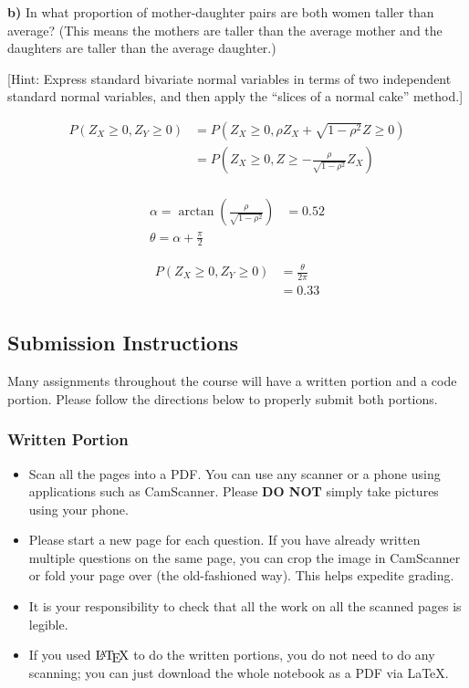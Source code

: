 \documentclass[11pt]{article}
\providecommand{\tightlist}{%
      \setlength{\itemsep}{0pt}\setlength{\parskip}{0pt}}
\let\Oldlatex\LaTeX
\renewcommand{\LaTeX}{\textrm{\Oldlatex}}
\begin{document}
\textbf{b)} In what proportion of mother-daughter pairs are both women
taller than average? (This means the mothers are taller than the average
mother and the daughters are taller than the average daughter.)

{[}Hint: Express standard bivariate normal variables in terms of two
independent standard normal variables, and then apply the ``slices of a
normal cake'' method.{]}

\begin{align*}
	P(Z_{X} \ge 0, Z_{Y} \ge 0) &= P(Z_{X} \ge 0, \rho Z_{X} + \sqrt{1-\rho^{2}} Z \ge 0) \\
				    &= P(Z_{X} \ge 0, Z \ge -\frac{\rho}{\sqrt{1-\rho^{2}}} Z_{X}) \\
\end{align*}


\begin{align*}
	\alpha = \arctan\left(\frac{\rho}{\sqrt{1-\rho^{2}}} \right)  &=  0.52 \\
	\theta = \alpha + \frac{\pi}{2}
\end{align*}

\begin{align*}
P(Z_{X} \ge 0, Z_{Y}\ge 0) &= \frac{\theta}{2\pi} \\
	&= 0.33 \\
\end{align*}


    \newpage

    \hypertarget{submission-instructions}{%
\subsection{Submission Instructions}\label{submission-instructions}}

Many assignments throughout the course will have a written portion and a
code portion. Please follow the directions below to properly submit both
portions.

\hypertarget{written-portion}{%
\subsubsection{Written Portion}\label{written-portion}}

\begin{itemize}
\tightlist
\item
  Scan all the pages into a PDF. You can use any scanner or a phone
  using applications such as CamScanner. Please \textbf{DO NOT} simply
  take pictures using your phone.
\item
  Please start a new page for each question. If you have already written
  multiple questions on the same page, you can crop the image in
  CamScanner or fold your page over (the old-fashioned way). This helps
  expedite grading.
\item
  It is your responsibility to check that all the work on all the
  scanned pages is legible.
\item
  If you used \(\LaTeX\) to do the written portions, you do not need to
  do any scanning; you can just download the whole notebook as a PDF via
  LaTeX.
\end{itemize}
\end{document}
